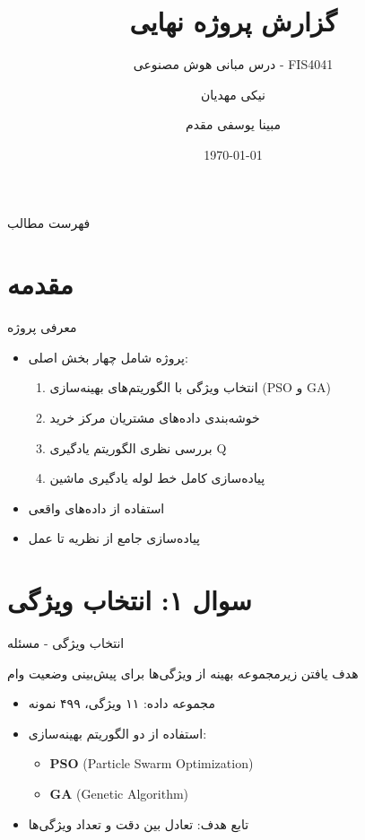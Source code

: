\documentclass[aspectratio=169]{beamer}
\title{گزارش پروژه نهایی}
\subtitle{درس مبانی هوش مصنوعی - FIS4041}
\author{نیکی مهدیان \and مبینا یوسفی مقدم}
\institute{دانشگاه}
\date{\today}
\begin{document}
\begin{frame}
\titlepage
\end{frame}

\begin{frame}{فهرست مطالب}
\tableofcontents
\end{frame}

\section{مقدمه}

\begin{frame}{معرفی پروژه}
\begin{itemize}
\item پروژه شامل چهار بخش اصلی:
\begin{enumerate}
\item انتخاب ویژگی با الگوریتم‌های بهینه‌سازی (PSO و GA)
\item خوشه‌بندی داده‌های مشتریان مرکز خرید
\item بررسی نظری الگوریتم یادگیری Q
\item پیاده‌سازی کامل خط لوله یادگیری ماشین
\end{enumerate}
\item استفاده از داده‌های واقعی
\item پیاده‌سازی جامع از نظریه تا عمل
\end{itemize}
\end{frame}

\section{سوال ۱: انتخاب ویژگی}

\begin{frame}{انتخاب ویژگی - مسئله}
\begin{block}{هدف}
یافتن زیرمجموعه بهینه از ویژگی‌ها برای پیش‌بینی وضعیت وام
\end{block}
\begin{itemize}
\item مجموعه داده: ۱۱ ویژگی، ۴۹۹ نمونه
\item استفاده از دو الگوریتم بهینه‌سازی:
\begin{itemize}
\item \textbf{PSO} (Particle Swarm Optimization)
\item \textbf{GA} (Genetic Algorithm)
\end{itemize}
\item تابع هدف: تعادل بین دقت و تعداد ویژگی‌ها
\end{itemize}
\end{frame}
\end{document}
